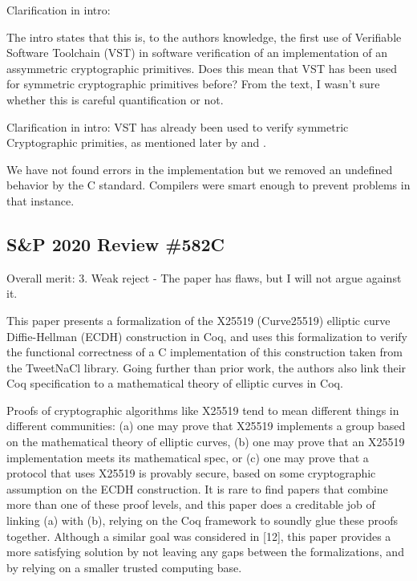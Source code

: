 Clarification in intro:

The intro states that this is, to the authors knowledge, the first use of
Verifiable Software Toolchain (VST) in software verification of an implementation
of an assymmetric cryptographic primitives. Does this mean that VST has been
used for symmetric cryptographic primitives before? From the text, I wasn't sure
whether this is careful quantification or not.


Clarification in intro: VST has already been used to verify symmetric Cryptographic
primities, as mentioned later by \cite{Beringer2015VerifiedCA} and \cite{2015-Appel}.

We have not found errors in the implementation but we removed an
undefined behavior by the C standard.
Compilers were smart enough to prevent problems in that instance.



\subsection{S\&P 2020 Review \#582C}

Overall merit: 3. Weak reject - The paper has flaws, but I will not argue against it.


\begin{center}
\end{center}

This paper presents a formalization of the X25519 (Curve25519) elliptic curve
Diffie-Hellman  (ECDH) construction in Coq, and uses this formalization to
verify the functional correctness of a C implementation of this construction
taken from the TweetNaCl library. Going further than prior work, the authors
also link their Coq specification to a mathematical theory of elliptic curves
in Coq.


\begin{center}
\end{center}

Proofs of cryptographic algorithms like X25519 tend to mean different things in
different communities: (a) one may prove that X25519 implements a group based on
the mathematical theory of elliptic curves, (b) one may prove that an X25519
implementation meets its mathematical spec, or (c) one may prove that a protocol
that uses X25519 is provably secure, based on some cryptographic assumption on
the ECDH construction. It is rare to find papers that combine more than one of
these proof levels, and this paper does a creditable job of linking (a) with (b),
relying on the Coq framework to soundly glue these proofs together. Although a
similar goal was considered in [12], this paper provides a more satisfying
solution by not leaving any gaps between the formalizations, and by relying on a
smaller trusted computing base.


